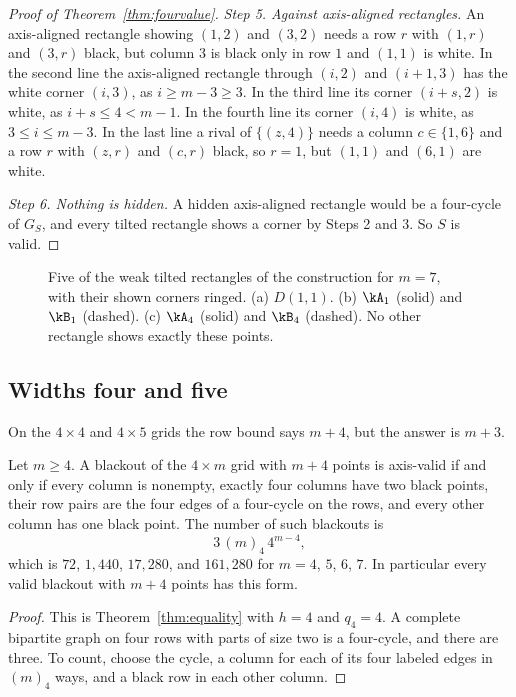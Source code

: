 \begin{proof}[Proof of Theorem~\ref{thm:fourvalue}]
\emph{Step 5. Against axis-aligned rectangles.} An axis-aligned rectangle showing $(1,2)$ and $(3,2)$ needs a row $r$ with $(1,r)$ and $(3,r)$ black, but column $3$ is black only in row $1$ and $(1,1)$ is white. In the second line the axis-aligned rectangle through $(i,2)$ and $(i+1,3)$ has the white corner $(i,3)$, as $i\ge m-3\ge3$. In the third line its corner $(i+s,2)$ is white, as $i+s\le4<m-1$. In the fourth line its corner $(i,4)$ is white, as $3\le i\le m-3$. In the last line a rival of $\{(z,4)\}$ needs a column $c\in\{1,6\}$ and a row $r$ with $(z,r)$ and $(c,r)$ black, so $r=1$, but $(1,1)$ and $(6,1)$ are white.

\emph{Step 6. Nothing is hidden.} A hidden axis-aligned rectangle would be a four-cycle of $G_S$, and every tilted rectangle shows a corner by Steps 2 and 3. So $S$ is valid.
\end{proof}

\begin{figure}[t]
\centering

\caption{Five of the weak tilted rectangles of the construction for $m=7$, with their shown corners ringed. (a) $D(1,1)$. (b) $\kA_1$ (solid) and $\kB_1$ (dashed). (c) $\kA_4$ (solid) and $\kB_4$ (dashed). No other rectangle shows exactly these points.}
\label{fig:fourtilted}
\end{figure}

\subsection{Widths four and five}

On the $4\times4$ and $4\times5$ grids the row bound says $m+4$, but the answer is $m+3$.

\begin{lemma}\label{lem:fourequality}
Let $m\ge4$. A blackout of the $4\times m$ grid with $m+4$ points is axis-valid if and only if every column is nonempty, exactly four columns have two black points, their row pairs are the four edges of a four-cycle on the rows, and every other column has one black point. The number of such blackouts is
\begin{equation}\label{eq:fourcand}
3\,(m)_4\,4^{m-4},
\end{equation}
which is $72$, $1{,}440$, $17{,}280$, and $161{,}280$ for $m=4$, $5$, $6$, $7$. In particular every valid blackout with $m+4$ points has this form.
\end{lemma}

\begin{proof}
This is Theorem~\ref{thm:equality} with $h=4$ and $q_4=4$. A complete bipartite graph on four rows with parts of size two is a four-cycle, and there are three. To count, choose the cycle, a column for each of its four labeled edges in $(m)_4$ ways, and a black row in each other column.
\end{proof}

